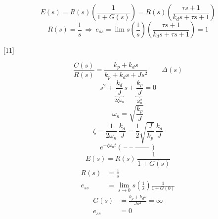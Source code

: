 \documentclass[11pt,a4paper]{article}
\begin{document}
\[
E(s)=R(s)\left(\frac{1}{1+G(s)}\right)=R(s)\left(\frac{\tau s+1}{k_d s+\tau s+1}\right)
\]
\[
R(s)=\frac{1}{s}\ \Rightarrow\ e_{ss}=\lim s\left(\frac{1}{s}\right)\left(\frac{\tau s+1}{k_d s+\tau s+1}\right)=1
\]

[11]

\[
\frac{C(s)}{R(s)}=\frac{k_p+k_d s}{k_p+k_d s+Js^2}\qquad\Delta(s)
\]
\[
s^2+\underbrace{\frac{k_d}{J}}_{2\zeta\omega_n}s+\underbrace{\frac{k_p}{J}}_{\omega_n^2}=0
\]
\[
\omega_n=\sqrt{\frac{k_p}{J}}
\]
\[
\zeta=\frac{1}{2\omega_n}\,\frac{k_d}{J}=\frac{1}{2}\sqrt{\frac{J}{k_p}}\,\frac{k_d}{J}
\]
\[
e^{-\zeta\omega_n t}\left(\,\text{-- -- ------}\,\right)
\]
\[
E(s)=R(s)\,\frac{1}{1+G(s)}
\]
\begin{align*}
R(s)&=\frac{1}{s}\\
e_{ss}&=\lim_{s\to 0}s\left(\frac{1}{s}\right)\frac{1}{1+G(0)}
\end{align*}
\begin{align*}
G(s)&=\frac{k_p+k_d s}{Js^2}=\infty\\
e_{ss}&=0
\end{align*}
\end{document}
